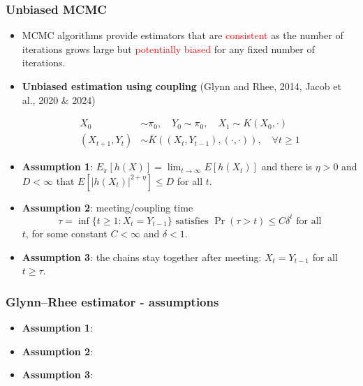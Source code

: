 \documentclass[aspectratio=169]{beamer}
\begin{document}
\begin{frame}
\frametitle{Unbiased MCMC}

\begin{itemize}
\item MCMC algorithms provide estimators that are \textcolor{red}{consistent} as the number of iterations grows large but \textcolor{red}{potentially biased} for any fixed number of iterations.

\item \textbf{Unbiased estimation using coupling} (Glynn and Rhee, 2014, Jacob et al., 2020 \& 2024)

\begin{align*}
X_0 &\sim \pi_0, \quad Y_0 \sim \pi_0, \quad X_1 \sim K(X_0, \cdot) \\
(X_{t+1}, Y_t) &\sim \bar{K}((X_t, Y_{t-1}), (\cdot, \cdot)), \quad \forall t \geq 1
\end{align*}

\item \textbf{Assumption 1}: $E_\pi[h(X)] = \lim_{t \to \infty} E[h(X_t)]$ and there is $\eta > 0$ and $D < \infty$ that $E[|h(X_t)|^{2+\eta}] \leq D$ for all $t$.

\item \textbf{Assumption 2}: meeting/coupling time
\[
\tau = \inf\{t \geq 1 : X_t = Y_{t-1}\} \text{ satisfies } \Pr(\tau > t) \leq C\delta^t \text{ for all}
\]
$t$, for some constant $C < \infty$ and $\delta < 1$.

\item \textbf{Assumption 3}: the chains stay together after meeting: $X_t = Y_{t-1}$ for all $t \geq \tau$.

\end{itemize}

\end{frame}

\begin{frame}
\frametitle{Glynn--Rhee estimator - assumptions}
\begin{itemize}
\item \textbf{Assumption 1}: 
\item \textbf{Assumption 2}: 
\item \textbf{Assumption 3}: 
\end{itemize}
\end{frame}
\end{document}
